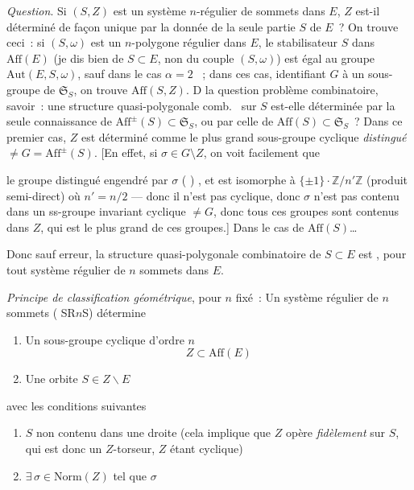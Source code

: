 \documentclass[11pt,a4paper]{article}
\begin{document}
\emph{Question}. Si $(S,Z)$ est un système $n$-régulier de sommets dans $E$, $Z$ est-il déterminé de façon unique par la donnée de la seule partie $S$ de $E$~? On trouve ceci~: si $(S,\omega)$ est un $n$-polygone régulier dans $E$, le stabilisateur  $S$ dans $\mathrm{Aff}(E)$ (je dis bien de $S \subset E$, non du couple $(S,\omega)$) est égal au groupe $\mathrm{Aut}(E,S,\omega)$, sauf dans le cas $\alpha = 2$ ~;  dans ces cas, identifiant $G$ à un sous-groupe de $\mathfrak{S}_S$, on trouve $\mathrm{Aff}(S,Z)$.
D\ill{} la question  problème combinatoire, savoir~: une structure quasi-polygonale comb.\  sur $S$ est-elle déterminée par la seule connaissance de $\mathrm{Aff}^{\pm}(S) \subset \mathfrak{S}_S$, ou par celle de $\mathrm{Aff}(S) \subset \mathfrak{S}_S$~? Dans ce premier cas, $Z$ est déterminé comme le plus grand sous-groupe cyclique \emph{distingué} $\neq G = \mathrm{Aff}^{\pm}(S)$. [En effet, si $\sigma \in G \setminus Z$, on voit facilement que

le groupe distingué  engendré par $\sigma$ (  \ill{})  , et \ill{} est isomorphe à $\{\pm 1\}\cdot\mathbb{Z}/n'\mathbb{Z}$ (produit semi-direct) où $n' = n/2$ --- donc il n'est pas cyclique, donc $\sigma$ n'est pas contenu dans un ss-groupe invariant cyclique $\neq G$, donc tous ces groupes  sont contenus dans $Z$, qui est le plus grand de ces groupes.] Dans le cas de $\mathrm{Aff}(S)$…

Donc sauf erreur, la structure quasi-polygonale combinatoire de $S \subset E$ est  , pour tout système régulier de $n$ sommets dans $E$.

\emph{Principe de classification géométrique}, pour $n$ fixé~: Un système régulier de $n$ sommets ( SR$n$S) détermine
\begin{enumerate}
  \item[a)] Un sous-groupe cyclique d'ordre $n$
  \[ Z \subset \mathrm{Aff}(E) \]
  \item[b)] Une orbite $S \in Z\backslash E$
\end{enumerate}
avec les conditions suivantes
\begin{enumerate}
  \item[1)] $S$ non contenu dans une droite (cela implique que $Z$ opère \emph{fidèlement} sur $S$, qui est donc un $Z$-torseur, $Z$ étant cyclique)
  \item[2)] $\exists\, \sigma \in \mathrm{Norm}(Z)$ \struck{\ill{}} tel que $\sigma$  
\end{enumerate}
\end{document}
